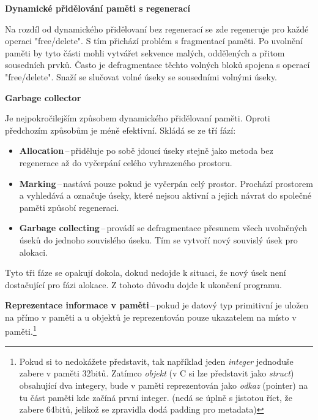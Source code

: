 \begin{Large}\vspace{0,5cm} \textbf{Dynamické přidělování paměti s regenerací}
\end{Large}

 Na rozdíl od dynamického přidělovaní bez regenerací se zde regeneruje pro každé operaci "free/delete". S tím přichází problém s fragmentací paměti. Po uvolnění paměti by tyto části mohli vytvářet sekvence malých, oddělených a přitom sousedních prvků. Často je defragmentace těchto volných bloků spojena s operací "free/delete". Snaží se slučovat volné úseky se sousedními volnými úseky.

\begin{Large}\vspace{0,5cm} \textbf{Garbage collector}
\end{Large}

 Je nejpokročilejším způsobem dynamického přidělovaní paměti. Oproti předchozím způsobům je méně efektivní. 
Skládá se ze tří fází:
\begin{itemize}
    \item \textbf{Allocation}\,--\,přiděluje po sobě jdoucí úseky stejně jako metoda bez regenerace až do vyčerpání celého vyhrazeného prostoru.
    \item\textbf{Marking}\,--\,nastává pouze pokud je vyčerpán celý prostor. Prochází prostorem a vyhledává a označuje úseky, které nejsou aktivní a jejich návrat do společné paměti způsobí regeneraci.
    \item\textbf{Garbage collecting}\,--\,provádí se defragmentace přesunem všech uvolněných úseků do jednoho souvislého úseku. Tím se vytvoří nový souvislý úsek pro alokaci.
\end{itemize}

 Tyto tři fáze se opakují dokola, dokud nedojde k situaci, že nový úsek není dostačující pro fázi alokace. Z tohoto důvodu dojde k ukončení programu.

\vspace{1cm}
\textbf{Reprezentace informace v paměti}\,--\,pokud je datový typ primitivní je uložen na přímo v paměti a u objektů je reprezentován pouze ukazatelem na místo v paměti.\footnote{Pokud si to nedokážete představit, tak například jeden \textit{integer} jednoduše zabere v paměti 32bitů. Zatímco \textit{objekt} (v C si lze představit jako \textit{struct}) obsahující dva integery, bude v paměti reprezentován jako \textit{odkaz} (pointer) na tu část paměti kde začíná první integer. (nedá se úplně s jistotou říct, že zabere 64bitů, jelikož se zpravidla dodá padding pro metadata)} 







